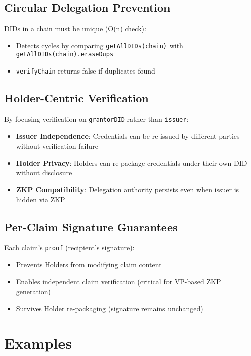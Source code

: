 \subsection{Circular Delegation Prevention}

DIDs in a chain must be unique (O(n) check):

\begin{itemize}
  \item Detects cycles by comparing \texttt{getAllDIDs(chain)} with \texttt{getAllDIDs(chain).eraseDups}
  \item \texttt{verifyChain} returns false if duplicates found
\end{itemize}

\subsection{Holder-Centric Verification}

By focusing verification on \texttt{grantorDID} rather than \texttt{issuer}:

\begin{itemize}
  \item \textbf{Issuer Independence}: Credentials can be re-issued by different parties without verification failure
  \item \textbf{Holder Privacy}: Holders can re-package credentials under their own DID without disclosure
  \item \textbf{ZKP Compatibility}: Delegation authority persists even when issuer is hidden via ZKP
\end{itemize}

\subsection{Per-Claim Signature Guarantees}

Each claim's \texttt{proof} (recipient's signature):

\begin{itemize}
  \item Prevents Holders from modifying claim content
  \item Enables independent claim verification (critical for VP-based ZKP generation)
  \item Survives Holder re-packaging (signature remains unchanged)
\end{itemize}

\section{Examples}

